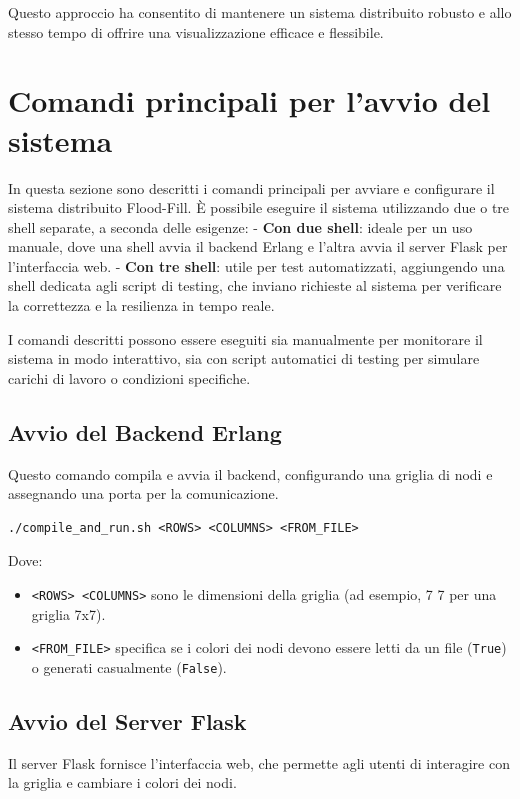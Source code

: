 \documentclass[12pt, a4paper]{report}
\begin{document}
Questo approccio ha consentito di mantenere un sistema distribuito robusto e allo stesso tempo di offrire una visualizzazione efficace e flessibile.

\section{Comandi principali per l'avvio del sistema}

In questa sezione sono descritti i comandi principali per avviare e configurare il sistema distribuito Flood-Fill. È possibile eseguire il sistema utilizzando due o tre shell separate, a seconda delle esigenze:
- \textbf{Con due shell}: ideale per un uso manuale, dove una shell avvia il backend Erlang e l’altra avvia il server Flask per l’interfaccia web.
- \textbf{Con tre shell}: utile per test automatizzati, aggiungendo una shell dedicata agli script di testing, che inviano richieste al sistema per verificare la correttezza e la resilienza in tempo reale.

I comandi descritti possono essere eseguiti sia manualmente per monitorare il sistema in modo interattivo, sia con script automatici di testing per simulare carichi di lavoro o condizioni specifiche.

\subsection{Avvio del Backend Erlang}
Questo comando compila e avvia il backend, configurando una griglia di nodi e assegnando una porta per la comunicazione. 

\begin{tcolorbox}[title=Comandi di Avvio in Erlang]
\begin{verbatim}
./compile_and_run.sh <ROWS> <COLUMNS> <FROM_FILE>
\end{verbatim}
\end{tcolorbox}

\noindent Dove:
\begin{itemize}
\item \texttt{<ROWS> <COLUMNS>} sono le dimensioni della griglia (ad esempio, 7 7 per una griglia 7x7).
\item \texttt{<FROM\_FILE>} specifica se i colori dei nodi devono essere letti da un file (\texttt{True}) o generati casualmente (\texttt{False}).
\end{itemize}

\subsection{Avvio del Server Flask}
Il server Flask fornisce l’interfaccia web, che permette agli utenti di interagire con la griglia e cambiare i colori dei nodi.
\end{document}
